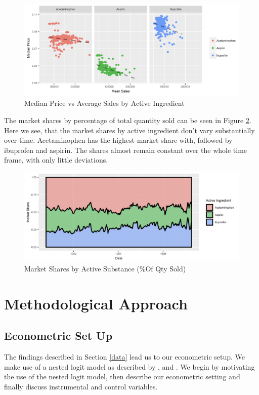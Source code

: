 \documentclass[12pt, authoryear]{elsarticle}
\begin{document}
\begin{figure}[H]
	\centering
	\includegraphics[clip, angle=0, width=1\textwidth]{active_sub_scatter.jpg}
	\caption{ Median Price vs Average Sales by Active Ingredient }\label{new}
\end{figure}

The market shares by percentage of total quantity sold can be seen in Figure \ref{new2}. Here we see, that the market shares by active ingredient don't vary substantially over time. Acetaminophen has the highest market share with, followed by ibuprofen and aspirin. The shares almost remain constant over the whole time frame, with only little deviations.


\begin{figure}[H]
	\centering
	\includegraphics[clip, angle=0, width=1\textwidth]{market_share.jpg}
	\caption{ Market Shares by Active Substance (\%Of Qty Sold)}\label{new2}
\end{figure}

\section{Methodological Approach} \label{method}
\subsection{Econometric Set Up} 
The findings described in Section \ref{data} lead us to our econometric setup. We make use of a nested logit model as described by \cite{mcfadden1978modeling}, \cite{cardell1997variance} and \cite{berry1994estimating}. We begin by motivating the use of the nested logit model, then describe our econometric setting and finally discuss instrumental and control variables.
\end{document}
